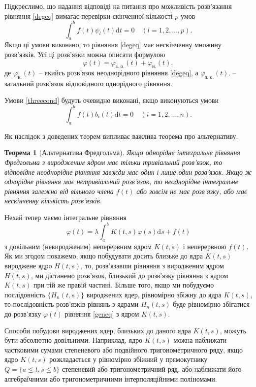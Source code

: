 \documentclass[14pt,twoside]{extreport}
\theoremstyle{mystyle}
\newtheorem{thm}{Теорема}
\numberwithin{equation}{chapter}
\begin{document}
\begin{enumerate}
Підкреслимо, що надання відповіді на питання про можливість розв'язання рівняння \eqref{degeq} вимагає перевірки скінченної кількості $p$ умов
\[
 \int_{a}^{b}f(t)\psi_{l}(t)\mathrm{d}t=0 \quad (l=1, 2, \ldots, p).
\]
Якщо ці умови виконано, то рівняння \eqref{degeq} має нескінченну множину розв'язків. Усі ці розв'язки можна описати формулою
\[
 \varphi(t) = \varphi_{\textrm{з. о.}}(t) + \varphi_{\textrm{н.}}(t),
\]
де $\varphi_{\textrm{н.}}(t)$ -- якийсь розв'язок неоднорідного рівняння \eqref{degeq}, а $\varphi_{\textrm{з. о.}}(t)$. -- загальний розв'язок відповідного однорідного рівняння.

Умови \eqref{threecond} будуть очевидно виконані, якщо виконуються умови
\[
 \int_{a}^{b}f(t)b_{i}(t)\mathrm{d}t=0 \quad (i= 1, 2, \ldots, n).
\]

Як наслідок з доведених теорем випливає важлива теорема про альтернативу.

\begin{thm}[Альтернатива Фредгольма]
Якщо однорідне інтегральне рівняння Фредгольма з виродженим ядром має тільки тривіальний розв'язок, то відповідне неоднорідне рівняння завжди має один і лише один розв'язок. Якщо ж однорідне рівняння має нетривіальний розв'язок, то неоднорідне інтегральне рівняння залежно від вільного члена $f(t)$ або зовсім не має розв'язку, або має нескінченну кількість розв'язків.
\end{thm}
\end{enumerate}

Нехай тепер маємо інтегральне рівняння
\begin{equation}\label{geneq}
 \varphi(t)=\lambda \int_{a}^{b} K(t, s)\varphi(s)\mathrm{d}s + f(t)
\end{equation}
з довільним (невиродженим) неперервним ядром $K(t, s)$ і неперервною $f(t)$. Як ми згодом покажемо, якщо побудувати досить близьке до ядра $K(t, s)$ вироджене ядро $H(t, s)$, то, розв'язавши рівняння з виродженим ядром $H(t, s)$, ми дістанемо розв'язок, близький до розв'язку рівняння з ядром $K(t, s)$ при тій же правій частині. Більше того, якщо ми побудуємо послідовність $\{H_n(t, s)\}$ вироджених ядер, рівномірно збіжну до ядра $K(t, s)$, то послідовність розв'язків рівнянь з ядрами $H_n(t, s)$ буде рівномірно збігатися до розв'язку $\varphi(t)$ рівняння \eqref{geneq} з ядром $K(t, s)$.

Способи побудови вироджених ядер, близьких до даного ядра $K(t, s)$, можуть бути абсолютно довільними. Наприклад, ядро $K(t, s)$ можна наближати частковими сумами степеневого або подвійного тригонометричного ряду, якщо ядро $K(t, s)$ розкладається у рівномірно збіжний у прямокутнику $Q=\{a \leqslant t, s \leqslant b\}$ степеневий або тригонометричний ряд, або наближати його алгебраїчними або тригонометричними інтерполяційними поліномами.
\end{document}
